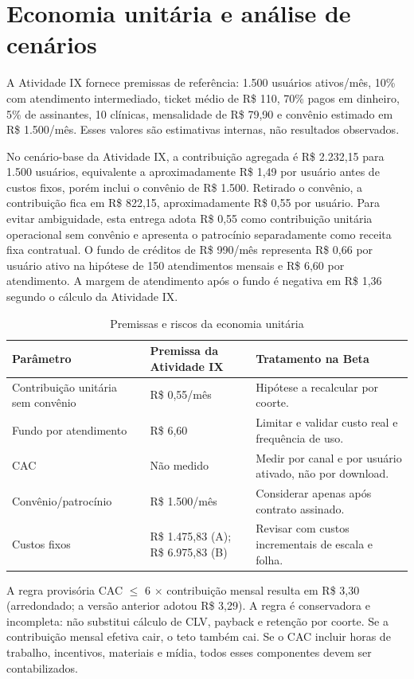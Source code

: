 \section{Economia unitária e análise de cenários}
A Atividade IX fornece premissas de referência: 1.500 usuários ativos/mês, 10\% com atendimento intermediado, ticket médio de R\$ 110, 70\% pagos em dinheiro, 5\% de assinantes, 10 clínicas, mensalidade de R\$ 79,90 e convênio estimado em R\$ 1.500/mês. Esses valores são estimativas internas, não resultados observados.

No cenário-base da Atividade IX, a contribuição agregada é R\$ 2.232,15 para 1.500 usuários, equivalente a aproximadamente R\$ 1,49 por usuário antes de custos fixos, porém inclui o convênio de R\$ 1.500. Retirado o convênio, a contribuição fica em R\$ 822,15, aproximadamente R\$ 0,55 por usuário. Para evitar ambiguidade, esta entrega adota R\$ 0,55 como contribuição unitária operacional sem convênio e apresenta o patrocínio separadamente como receita fixa contratual. O fundo de créditos de R\$ 990/mês representa R\$ 0,66 por usuário ativo na hipótese de 150 atendimentos mensais e R\$ 6,60 por atendimento. A margem de atendimento após o fundo é negativa em R\$ 1,36 segundo o cálculo da Atividade IX.

\begin{table}[H]\centering
\caption{Premissas e riscos da economia unitária}
\begin{tabularx}{\textwidth}{L{4cm}L{3cm}Y}
\toprule
Parâmetro & Premissa da Atividade IX & Tratamento na Beta\\\midrule
Contribuição unitária sem convênio & R\$ 0,55/mês & Hipótese a recalcular por coorte.\\
Fundo por atendimento & R\$ 6,60 & Limitar e validar custo real e frequência de uso.\\
CAC & Não medido & Medir por canal e por usuário ativado, não por download.\\
Convênio/patrocínio & R\$ 1.500/mês & Considerar apenas após contrato assinado.\\
Custos fixos & R\$ 1.475,83 (A); R\$ 6.975,83 (B) & Revisar com custos incrementais de escala e folha.\\
\bottomrule
\end{tabularx}
\end{table}

A regra provisória CAC $\leq$ 6 $\times$ contribuição mensal resulta em R\$ 3,30 (arredondado; a versão anterior adotou R\$ 3,29). A regra é conservadora e incompleta: não substitui cálculo de CLV, payback e retenção por coorte. Se a contribuição mensal efetiva cair, o teto também cai. Se o CAC incluir horas de trabalho, incentivos, materiais e mídia, todos esses componentes devem ser contabilizados.

